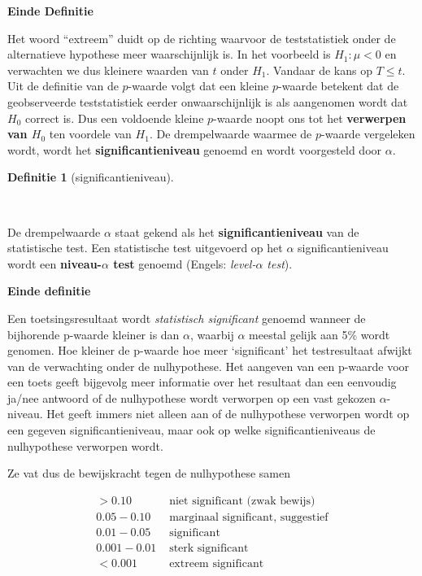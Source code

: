 \documentclass[
  dutch,
  letterpaper,
  12pt]{book}
\theoremstyle{definition}
\theoremstyle{definition}
\newtheorem{definition}{Definitie}[chapter]
\theoremstyle{definition}
\theoremstyle{remark}
\begin{document}
\textbf{Einde Definitie}

Het woord ``extreem'' duidt op de richting waarvoor de teststatistiek
onder de alternatieve hypothese meer waarschijnlijk is. In het voorbeeld
is \(H_1: \mu < 0\) en verwachten we dus kleinere waarden van \(t\)
onder \(H_1\). Vandaar de kans op \(T\leq t\). Uit de definitie van de
\(p\)-waarde volgt dat een kleine \(p\)-waarde betekent dat de
geobserveerde teststatistiek eerder onwaarschijnlijk is als aangenomen
wordt dat \(H_0\) correct is. Dus een voldoende kleine \(p\)-waarde
noopt ons tot het \textbf{verwerpen van \(H_0\)} ten voordele van
\(H_1\). De drempelwaarde waarmee de \(p\)-waarde vergeleken wordt,
wordt het \textbf{significantieniveau} genoemd en wordt voorgesteld door
\(\alpha\).

\begin{definition}[significantieniveau]\protect\hypertarget{def-significantieniveau}{}\label{def-significantieniveau}

~

\end{definition}

De drempelwaarde \(\alpha\) staat gekend als het
\textbf{significantieniveau} van de statistische test. Een statistische
test uitgevoerd op het \(\alpha\) significantieniveau wordt een
\textbf{niveau-\(\alpha\) test} genoemd (Engels: \emph{level-\(\alpha\)
test}).

\textbf{Einde definitie}

Een toetsingsresultaat wordt \emph{statistisch significant} genoemd
wanneer de bijhorende p-waarde kleiner is dan \(\alpha\), waarbij
\(\alpha\) meestal gelijk aan 5\% wordt genomen. Hoe kleiner de p-waarde
hoe meer `significant' het testresultaat afwijkt van de verwachting
onder de nulhypothese. Het aangeven van een p-waarde voor een toets
geeft bijgevolg meer informatie over het resultaat dan een eenvoudig
ja/nee antwoord of de nulhypothese wordt verworpen op een vast gekozen
\(\alpha\)-niveau. Het geeft immers niet alleen aan of de nulhypothese
verworpen wordt op een gegeven significantieniveau, maar ook op welke
significantieniveaus de nulhypothese verworpen wordt.

Ze vat dus de bewijskracht tegen de nulhypothese samen

\[\begin{array}{cl}>0.10 & \text{ niet significant (zwak bewijs)}\\0.05-0.10 & \text{ marginaal significant, suggestief}\\0.01-0.05 & \text{ significant}\\0.001-0.01 & \text{ sterk significant}\\<0.001 & \text{ extreem significant}\end{array}\]
\end{document}

